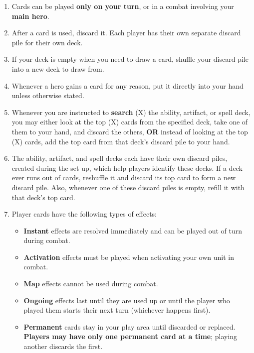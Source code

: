 \begin{enumerate}
  \item Cards can be played \textbf{only on your turn}, or in a combat involving your \textbf{main hero}.
  \item After a card is used, discard it.
    Each player has their own separate discard pile for their own deck.
  \item If your deck is empty when you need to draw a card, shuffle your discard pile into a new deck to draw from.
  \item Whenever a hero gains a card for any reason, put it directly into your hand unless otherwise stated.
  \item Whenever you are instructed to \textbf{search} (X) the ability, artifact, or spell deck, you may either look at the top (X) cards from the specified deck, take one of them to your hand, and discard the others, \textbf{OR} instead of looking at the top (X) cards, add the top card from that deck’s discard pile to your hand.
  \item The ability, artifact, and spell decks each have their own discard piles, created during the set up, which help players identify these decks.
    If a deck ever runs out of cards, reshuffle it and discard its top card to form a new discard pile.
    Also, whenever one of these discard piles is empty, refill it with that deck’s top card.
  \item Player cards have the following types of effects:
  \begin{itemize}
        \item \textbf{Instant}  effects are resolved immediately and can be played out of turn during combat.
        \item \textbf{Activation}  effects must be played when activating your own unit in combat.
        \item \textbf{Map}  effects cannot be used during combat.
        \item \textbf{Ongoing}  effects last until they are used up or until the player who played them starts their next turn (whichever happens first).
        \item \textbf{Permanent}  cards stay in your play area until discarded or replaced.
          \textbf{Players may have only one permanent card at a time}; playing another discards the first.
    \end{itemize}

\end{enumerate}

